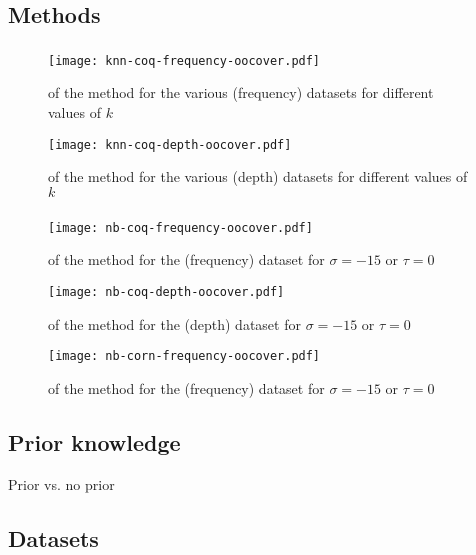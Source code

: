 \label{section:results}

\subsection{Methods}

\subsubsection{\knn}
\begin{figure}[H]
  \centering
  \texttt{[image: knn-coq-frequency-oocover.pdf]}
  \caption{\oocover of the \knn method for the various (frequency) datasets for different values of $k$}
\end{figure}

\begin{figure}[H]
  \centering
  \texttt{[image: knn-coq-depth-oocover.pdf]}
  \caption{\oocover of the \knn method for the various (depth) datasets for different values of $k$}
\end{figure}

\subsubsection{\nb}
\begin{figure}[H]
  \centering
  \texttt{[image: nb-coq-frequency-oocover.pdf]}
  \caption{\oocover of the \nb method for the \coq (frequency) dataset for $\sigma = -15$ or $\tau = 0$}
\end{figure}

\begin{figure}[H]
  \centering
  \texttt{[image: nb-coq-depth-oocover.pdf]}
  \caption{\oocover of the \nb method for the \coq (depth) dataset for $\sigma = -15$ or $\tau = 0$}
\end{figure}

\begin{figure}[H]
  \centering
  \texttt{[image: nb-corn-frequency-oocover.pdf]}
  \caption{\oocover of the \nb method for the \corn (frequency) dataset for $\sigma = -15$ or $\tau = 0$}
\end{figure}

\subsection{Prior knowledge}
Prior vs. no prior

\subsection{Datasets}


